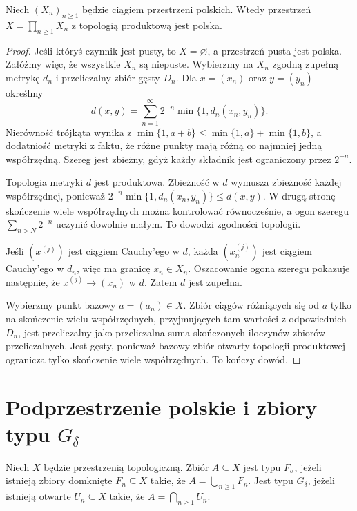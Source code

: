 \begin{twierdzenie}
\label{thm:topog-polskie-iloczyn}
Niech $(X_n)_{n\ge1}$ będzie ciągiem
przestrzeni polskich.
Wtedy przestrzeń
$X=\prod_{n\ge1}X_n$
z topologią produktową jest polska.
\end{twierdzenie}
\begin{proof}
Jeśli któryś czynnik jest pusty,
to $X=\varnothing$, a przestrzeń
pusta jest polska. Załóżmy więc,
że wszystkie $X_n$ są niepuste.
Wybierzmy na $X_n$ zgodną
zupełną metrykę $d_n$ i
przeliczalny zbiór gęsty $D_n$.
Dla $x=(x_n)$ oraz $y=(y_n)$
określmy
\[
d(x,y)=\sum_{n=1}^{\infty}
2^{-n}\min\{1,d_n(x_n,y_n)\}.
\]
Nierówność trójkąta wynika z
$\min\{1,a+b\}\le
\min\{1,a\}+\min\{1,b\}$,
a dodatniość metryki z faktu,
że różne punkty mają różną
co najmniej jedną współrzędną.
Szereg jest zbieżny, gdyż każdy
składnik jest ograniczony przez $2^{-n}$.

Topologia metryki $d$ jest produktowa.
Zbieżność w $d$ wymusza zbieżność
każdej współrzędnej, ponieważ
$2^{-n}\min\{1,d_n(x_n,y_n)\}\le d(x,y)$.
W drugą stronę skończenie wiele
współrzędnych można kontrolować
równocześnie, a ogon szeregu
$\sum_{n>N}2^{-n}$ uczynić
dowolnie małym. To dowodzi
zgodności topologii.

Jeśli $(x^{(j)})$ jest ciągiem
Cauchy'ego w $d$, każda
$(x_n^{(j)})$ jest ciągiem
Cauchy'ego w $d_n$, więc
ma granicę $x_n\in X_n$.
Oszacowanie ogona szeregu
pokazuje następnie, że
$x^{(j)}\to(x_n)$ w $d$.
Zatem $d$ jest zupełna.

Wybierzmy punkt bazowy
$a=(a_n)\in X$.
Zbiór ciągów różniących się od
$a$ tylko na skończenie wielu
współrzędnych, przyjmujących
tam wartości z odpowiednich $D_n$,
jest przeliczalny jako
przeliczalna suma skończonych
iloczynów zbiorów przeliczalnych.
Jest gęsty, ponieważ bazowy
zbiór otwarty topologii produktowej
ogranicza tylko skończenie wiele
współrzędnych. To kończy dowód.
\end{proof}

\section{Podprzestrzenie polskie i zbiory typu \texorpdfstring{$G_\delta$}{G-delta}}
\label{sec:topog-polskie-gdelta}

\begin{definicja}
\label{def:topog-polskie-fsigma-gdelta}
Niech $X$ będzie przestrzenią
topologiczną. Zbiór $A\subseteq X$
jest typu $F_\sigma$, jeżeli
istnieją zbiory domknięte
$F_n\subseteq X$ takie, że
$A=\bigcup_{n\ge1}F_n$.
Jest typu $G_\delta$, jeżeli
istnieją otwarte $U_n\subseteq X$
takie, że $A=\bigcap_{n\ge1}U_n$.
\end{definicja}

